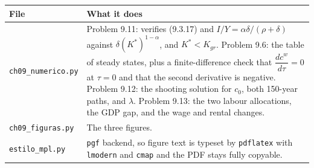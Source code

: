 \documentclass[12pt, letterpaper]{article}
\newcommand{\dd}[2]{\dfrac{d #1}{d #2}}
\newcommand{\stst}{^{\ast}}
\begin{document}
\begin{center}
\begin{tabular}{@{}lp{10.2cm}@{}}
\toprule
\textbf{File} & \textbf{What it does} \\
\midrule
\texttt{ch09\_numerico.py} & Problem 9.11: verifies (9.3.17) and $I/Y=\alpha\delta/(\rho+\delta)$
against $\delta (K\stst)^{1-\alpha}$, and $K\stst<K_{gr}$. Problem 9.6: the table of steady states,
plus a finite-difference check that $\dd{c^w}{\tau}=0$ at $\tau=0$ and that the second derivative
is negative. Problem 9.12: the shooting solution for $c_0$, both 150-year paths, and $\lambda$.
Problem 9.13: the two labour allocations, the GDP gap, and the wage and rental changes. \\
\texttt{ch09\_figuras.py} & The three figures. \\
\texttt{estilo\_mpl.py} & \texttt{pgf} backend, so figure text is typeset by \texttt{pdflatex}
with \texttt{lmodern} and \texttt{cmap} and the PDF stays fully copyable. \\
\bottomrule
\end{tabular}
\end{center}
\end{document}

